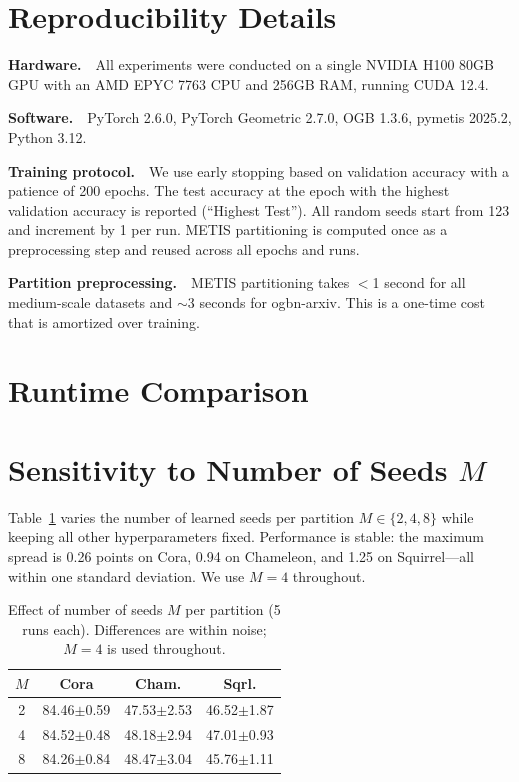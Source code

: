 \section{Reproducibility Details}
\label{app:reproducibility}

\textbf{Hardware.}~~All experiments were conducted on a single NVIDIA H100 80GB GPU with an AMD EPYC 7763 CPU and 256GB RAM, running CUDA 12.4.

\textbf{Software.}~~PyTorch 2.6.0, PyTorch Geometric 2.7.0, OGB 1.3.6, pymetis 2025.2, Python 3.12.

\textbf{Training protocol.}~~We use early stopping based on validation accuracy with a patience of 200 epochs. The test accuracy at the epoch with the highest validation accuracy is reported (``Highest Test''). All random seeds start from 123 and increment by 1 per run. METIS partitioning is computed once as a preprocessing step and reused across all epochs and runs.

\textbf{Partition preprocessing.}~~METIS partitioning takes $<$1 second for all medium-scale datasets and $\sim$3 seconds for ogbn-arxiv. This is a one-time cost that is amortized over training.

\section{Runtime Comparison}
\label{app:runtime}

\section{Sensitivity to Number of Seeds $M$}
\label{app:m_ablation}

Table~\ref{tab:m_ablation} varies the number of learned seeds per partition $M \in \{2, 4, 8\}$ while keeping all other hyperparameters fixed. Performance is stable: the maximum spread is 0.26 points on Cora, 0.94 on Chameleon, and 1.25 on Squirrel---all within one standard deviation. We use $M=4$ throughout.

\begin{table}[t]
\centering
\small
\begin{tabular}{c|ccc}
\toprule
$M$ & \textbf{Cora} & \textbf{Cham.} & \textbf{Sqrl.} \\
\midrule
2 & 84.46{\scriptsize$\pm$0.59} & 47.53{\scriptsize$\pm$2.53} & 46.52{\scriptsize$\pm$1.87} \\
4 & 84.52{\scriptsize$\pm$0.48} & 48.18{\scriptsize$\pm$2.94} & 47.01{\scriptsize$\pm$0.93} \\
8 & 84.26{\scriptsize$\pm$0.84} & 48.47{\scriptsize$\pm$3.04} & 45.76{\scriptsize$\pm$1.11} \\
\bottomrule
\end{tabular}
\caption{Effect of number of seeds $M$ per partition (5 runs each). Differences are within noise; $M=4$ is used throughout.}
\label{tab:m_ablation}
\end{table}

